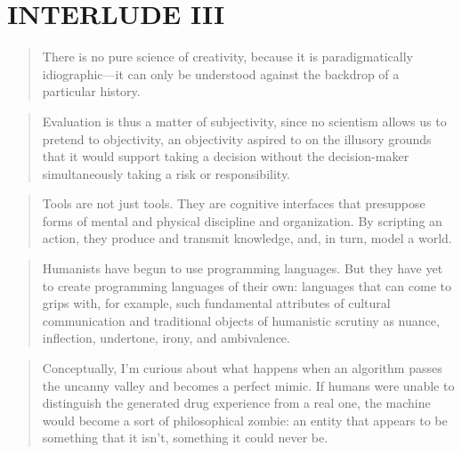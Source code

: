 
\pagestyle{empty}

\chapter*{INTERLUDE III}
\label{interlude3}



\begin{quotation}
  There is no pure science of creativity, because it is paradigmatically idiographic---it can only be understood against the backdrop of a particular history.
\end{quotation}

\begin{quotation}
  Evaluation is thus a matter of subjectivity, since no scientism allows us to pretend to objectivity, an objectivity aspired to on the illusory grounds that it would support taking a decision without the decision-maker simultaneously taking a risk or responsibility. 
\end{quotation}

\begin{quotation}
  Tools are not just tools. They are cognitive interfaces that presuppose forms of mental and physical discipline and organization. By scripting an action, they produce and transmit knowledge, and, in turn, model a world. 
\end{quotation}

\begin{quotation}
  Humanists have begun to use programming languages. But they have yet to create programming languages of their own: languages that can come to grips with, for example, such fundamental attributes of cultural communication and traditional objects of humanistic scrutiny as nuance, inflection, undertone, irony, and ambivalence. 
\end{quotation}

\begin{quotation}
  Conceptually, I'm curious about what happens when an algorithm passes the uncanny valley and becomes a perfect mimic. If humans were unable to distinguish the generated drug experience from a real one, the machine would become a sort of philosophical zombie: an entity that appears to be something that it isn't, something it could never be. 
\end{quotation}


\pagestyle{fania}


\clearpage